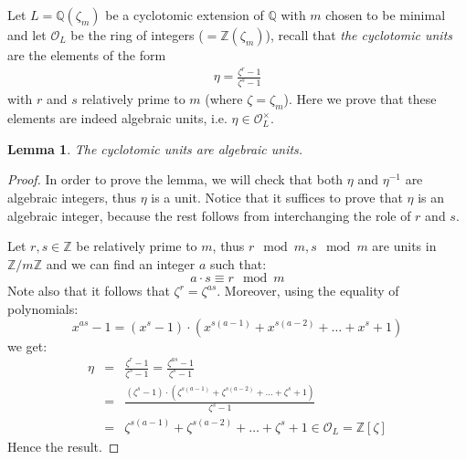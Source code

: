 \documentclass[12pt]{article}
\newtheorem{lemma}{Lemma}
\newcommand{\Ints}{\mathbb{Z}}
\newcommand{\Rats}{\mathbb{Q}}
\begin{document}
Let $L=\Rats(\zeta_m)$ be a cyclotomic extension of $\Rats$ with $m$ chosen to be minimal and let $\mathcal{O}_L$ be the ring of integers ($=\Ints(\zeta_m)$), recall that \emph{the cyclotomic units} are the elements of the form
\begin{align*}
\eta=\frac{\zeta^r-1}{\zeta^s-1}
\end{align*}
with $r$ and $s$ relatively prime to $m$ (where $\zeta=\zeta_m$). Here we prove that these elements are indeed algebraic units, i.e. $\eta \in \mathcal{O}_L^\times$.

\begin{lemma}
The cyclotomic units are algebraic units. 
\end{lemma}
\begin{proof}
In order to prove the lemma, we will check that both $\eta$ and $\eta^{-1}$ are algebraic integers, thus $\eta$ is a unit. Notice that it suffices to prove that $\eta$ is an algebraic integer, because the rest follows from interchanging the role of $r$ and $s$.

Let $r,s\in \Ints$ be relatively prime to $m$, thus $r \mod m, s\mod m$ are units in $\Ints/m\Ints$ and we can find an integer $a$ such that:
$$a\cdot s \equiv r \mod m$$ 
Note also that it follows that $\zeta^r=\zeta^{as}$. Moreover, using the equality of polynomials:
$$x^{as}-1=(x^s-1)\cdot(x^{s(a-1)}+x^{s(a-2)}+\ldots+x^s+1)$$
we get:
\begin{eqnarray*}
\eta &=& \frac{\zeta^r-1}{\zeta^s-1}=\frac{\zeta^{as}-1}{\zeta^s-1}\\
&=& \frac{(\zeta^s-1)\cdot(\zeta^{s(a-1)}+\zeta^{s(a-2)}+\ldots+\zeta^s+1)}{\zeta^s-1}\\
&=& \zeta^{s(a-1)}+\zeta^{s(a-2)}+\ldots+\zeta^s+1 \in \mathcal{O}_L=\Ints[\zeta]
\end{eqnarray*}
Hence the result.
\end{proof}
\end{document}
